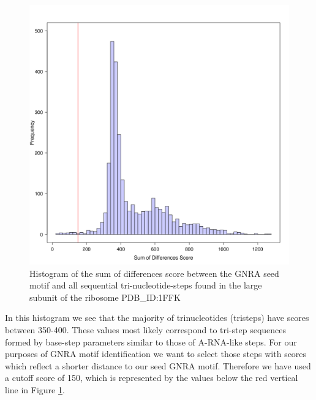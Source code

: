 \begin{figure}
\centering 
\includegraphics[angle=0, scale=0.5]{Chapter5/gnrahisto.png}
\caption{Histogram of  the sum of  differences score between  the GNRA
  seed  motif and  all  sequential tri-nucleotide-steps  found in  the
  large subunit of the ribosome PDB\_ID:1FFK}
\label{fig:gnrahist}
\end{figure}

In  this  histogram  we   see  that  the  majority  of  trinucleotides
(tristeps)  have scores  between  350-400.  These  values most  likely
correspond  to  tri-step  sequences  formed  by  base-step  parameters
similar to those of A-RNA-like  steps.  For our purposes of GNRA motif
identification we want to select those steps with scores which reflect
a shorter distance  to our seed GNRA motif.  Therefore  we have used a
cutoff score of 150, which is  represented by the values below the red
vertical line in Figure \ref{fig:gnrahist}.

